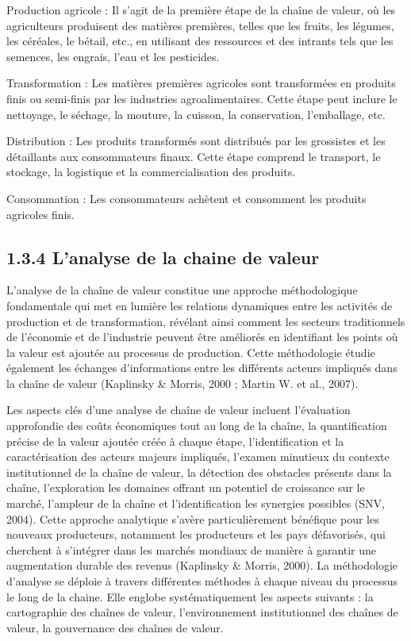 \documentclass[12pt,oneside]{report}
\begin{document}
Production agricole : Il s'agit de la première étape de la chaîne de valeur, où les agriculteurs produisent des matières premières, telles que les fruits, les légumes, les céréales, le bétail, etc., en utilisant des ressources et des intrants tels que les semences, les engrais, l'eau et les pesticides.

Transformation : Les matières premières agricoles sont transformées en produits finis ou semi-finis par les industries agroalimentaires. Cette étape peut inclure le nettoyage, le séchage, la mouture, la cuisson, la conservation, l'emballage, etc.

Distribution : Les produits transformés sont distribués par les grossistes et les détaillants aux consommateurs finaux. Cette étape comprend le transport, le stockage, la logistique et la commercialisation des produits.

Consommation : Les consommateurs achètent et consomment les produits agricoles finis.

\subsection{1.3.4 L’analyse de la chaine de valeur}
L'analyse de la chaîne de valeur constitue une approche méthodologique fondamentale qui met en lumière les relations dynamiques entre les activités de production et de transformation, révélant ainsi comment les secteurs traditionnels de l'économie et de l'industrie peuvent être améliorés en identifiant les points où la valeur est ajoutée au processus de production. Cette méthodologie étudie également les échanges d'informations entre les différents acteurs impliqués dans la chaîne de valeur (Kaplinsky \& Morris, 2000 ; Martin W. et al., 2007).

Les aspects clés d'une analyse de chaîne de valeur incluent l'évaluation approfondie des coûts économiques tout au long de la chaîne, la quantification précise de la valeur ajoutée créée à chaque étape, l'identification et la caractérisation des acteurs majeurs impliqués, l'examen minutieux du contexte institutionnel de la chaîne de valeur, la détection des obstacles présents dans la chaîne, l'exploration les domaines offrant un potentiel de croissance sur le marché, l'ampleur de la chaîne et l'identification les synergies possibles (SNV, 2004). Cette approche analytique s'avère particulièrement bénéfique pour les nouveaux producteurs, notamment les producteurs et les pays défavorisés, qui cherchent à s'intégrer dans les marchés mondiaux de manière à garantir une augmentation durable des revenus (Kaplinsky \& Morris, 2000). La méthodologie d'analyse se déploie à travers différentes méthodes à chaque niveau du processus le long de la chaine. Elle englobe systématiquement les aspects suivants : la cartographie des chaînes de valeur, l’environnement institutionnel des chaînes de valeur, la gouvernance des chaînes de valeur.
\end{document}
